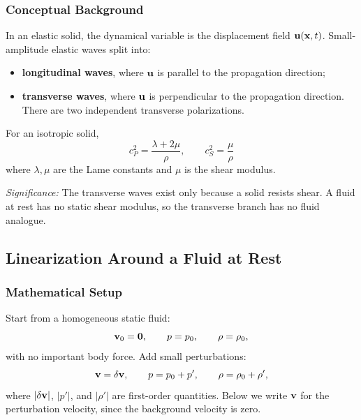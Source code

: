 \documentclass[../main.tex]{subfiles}
\begin{document}
\subsubsection*{Conceptual Background}
In an elastic solid, the dynamical variable is the displacement field
$\mathbf{u}(\mathbf{x},t)$. Small-amplitude elastic waves split into:
\begin{itemize}
  \item \textbf{longitudinal waves}, where $\mathbf{u}$ is parallel to the
  propagation direction;
  \item \textbf{transverse waves}, where $\mathbf{u}$ is perpendicular to the
  propagation direction. There are two independent transverse polarizations.
\end{itemize}
For an isotropic solid,
\begin{equation}
  \boxed{\;c_P^2=\frac{\lambda+2\mu}{\rho},\qquad
  c_S^2=\frac{\mu}{\rho}\;}
  \label{eq:lec22_elastic_wave_speeds}
\end{equation}
where $\lambda,\mu$ are the Lame constants and $\mu$ is the shear modulus.

\textit{Significance:} The transverse waves exist only because a solid resists
shear. A fluid at rest has no static shear modulus, so the transverse branch has
no fluid analogue.

\subsection{Linearization Around a Fluid at Rest}\label{sec:lec22:linearization}

\subsubsection*{Mathematical Setup}
Start from a homogeneous static fluid:
\begin{equation}
  \mathbf{v}_0=\mathbf{0},\qquad p=p_0,\qquad \rho=\rho_0,
  \label{eq:lec22_background}
\end{equation}
with no important body force. Add small perturbations:
\begin{equation}
  \mathbf{v}=\delta\mathbf{v},\qquad p=p_0+p',\qquad \rho=\rho_0+\rho',
  \label{eq:lec22_perturbations}
\end{equation}
where $|\delta\mathbf{v}|$, $|p'|$, and $|\rho'|$ are first-order quantities. Below we
write $\mathbf{v}$ for the perturbation velocity, since the background velocity is
zero.
\end{document}
